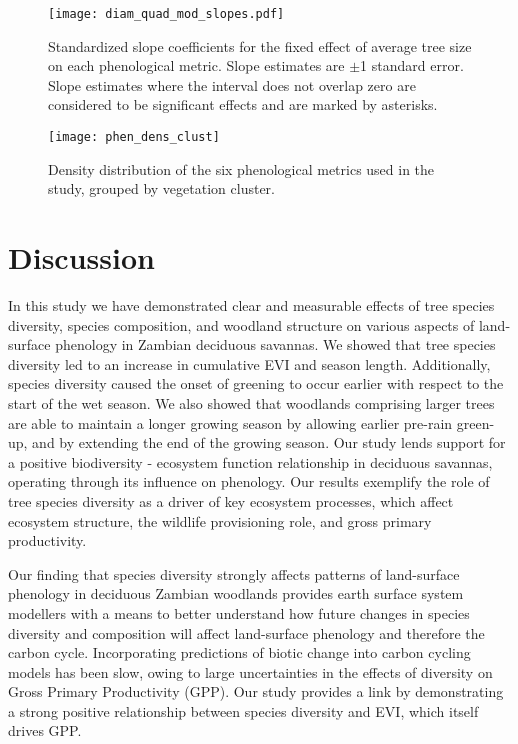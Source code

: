 \documentclass[11pt,a4paper]{article}
\begin{document}
\begin{figure}[H]
\centering
	\texttt{[image: diam\_quad\_mod\_slopes.pdf]}
	\caption{Standardized slope coefficients for the fixed effect of average tree size on each phenological metric. Slope estimates are $\pm$1 standard error. Slope estimates where the interval does not overlap zero are considered to be significant effects and are marked by asterisks.}
	\label{diam_quad_mod_slopes}
\end{figure}

\begin{figure}[H]
\centering
	\texttt{[image: phen\_dens\_clust]}
	\caption{Density distribution of the six phenological metrics used in the study, grouped by vegetation cluster.}
	\label{phen_dens_clust}
\end{figure}

\section{Discussion}

In this study we have demonstrated clear and measurable effects of tree species diversity, species composition, and woodland structure on various aspects of land-surface phenology in Zambian deciduous savannas. We showed that tree species diversity led to an increase in cumulative EVI and season length. Additionally, species diversity caused the onset of greening to occur earlier with respect to the start of the wet season. We also showed that woodlands comprising larger trees are able to maintain a longer growing season by allowing earlier pre-rain green-up, and by extending the end of the growing season. Our study lends support for a positive biodiversity - ecosystem function relationship in deciduous savannas, operating through its influence on phenology. Our results exemplify the role of tree species diversity as a driver of key ecosystem processes, which affect ecosystem structure, the wildlife provisioning role, and gross primary productivity.

Our finding that species diversity strongly affects patterns of land-surface phenology in deciduous Zambian woodlands provides earth surface system modellers with a means to better understand how future changes in species diversity and composition will affect land-surface phenology and therefore the carbon cycle. Incorporating predictions of biotic change into carbon cycling models has been slow, owing to large uncertainties in the effects of diversity on Gross Primary Productivity (GPP). Our study provides a link by demonstrating a strong positive relationship between species diversity and EVI, which itself drives GPP.
\end{document}
